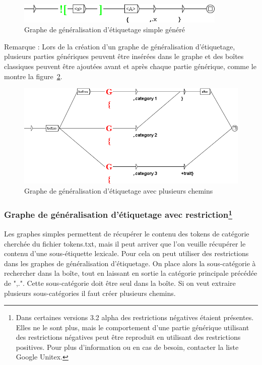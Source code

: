 \begin{figure}[!htb]
  \centering
  \includegraphics[width=10cm]{resources/img/graphe_generique_simple_genere.png}
  \caption{Graphe de généralisation d'étiquetage simple généré}
  \label{fig:graphe_generique_simple_genere}
\end{figure}

\bigskip
Remarque : Lors de la création d'un graphe de généralisation d'étiquetage, plusieurs parties génériques peuvent être insérées dans le graphe et des boîtes classiques peuvent être ajoutées avant et après chaque partie générique, comme le montre la figure~\ref{fig:graphe_generique_plusieurs_chemins}.

\begin{figure}[!htb]
  \centering
  \includegraphics[width=14cm]{resources/img/graphe_generique_plusieurs_chemins.png}
  \caption{Graphe de généralisation d'étiquetage avec plusieurs chemins}
  \label{fig:graphe_generique_plusieurs_chemins}
\end{figure}

\subsubsection{Graphe de généralisation d'étiquetage avec restriction\protect\footnote{Dans certaines versions 3.2 alpha des restrictions négatives étaient présentes. Elles ne le sont plus, mais le comportement d'une partie générique utilisant des restrictions négatives peut être reproduit en utilisant des restrictions positives. Pour plus d'information ou en cas de besoin, contacter la liste Google Unitex.}}

Les graphes simples permettent de récupérer le contenu des tokens de catégorie cherchée du fichier tokens.txt, mais il peut arriver que l'on veuille récupérer le contenu d'une sous-étiquette lexicale. Pour cela on peut utiliser des restrictions dans les graphes de généralisation d'étiquetage. On place alors la sous-catégorie à rechercher dans la boîte, tout en laissant en sortie la catégorie principale précédée de ",.". Cette sous-catégorie doit être seul dans la boîte. Si on veut extraire plusieurs sous-catégories il faut créer plusieurs chemins.


